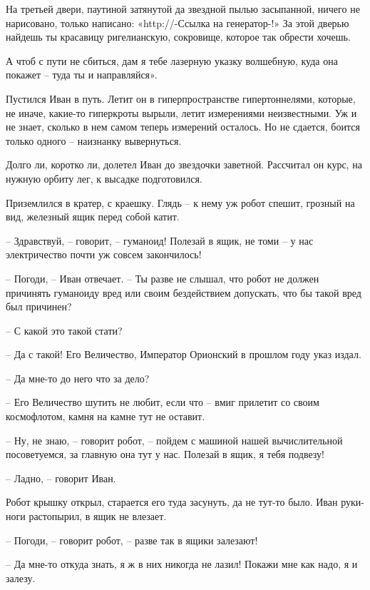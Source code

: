 \documentclass[ebook,oneside,final,openright]{memoir}
\begin{document}
\par
На третьей двери, паутиной затянутой да звездной пылью засыпанной, ничего не нарисовано, только написано: «http://-Ссылка на генератор-!» За этой дверью найдешь ты красавицу ригелианскую, сокровище, которое так обрести хочешь.\par
\par
А чтоб с пути не сбиться, дам я тебе лазерную указку волшебную, куда она покажет – туда ты и направляйся».\par
\par
Пустился Иван в путь. Летит он в гиперпространстве гипертоннелями, которые, не иначе, какие-то гиперкроты вырыли, летит измерениями неизвестными. Уж и не знает, сколько в нем самом теперь измерений осталось. Но не сдается, боится только одного – наизнанку вывернуться.\par
\par
Долго ли, коротко ли, долетел Иван до звездочки заветной. Рассчитал он курс, на нужную орбиту лег, к высадке подготовился.\par
\par
Приземлился в кратер, с краешку. Глядь – к нему уж робот спешит, грозный на вид, железный ящик перед собой катит.\par
– Здравствуй, – говорит, – гуманоид! Полезай в ящик, не томи – у нас электричество почти уж совсем закончилось!\par
– Погоди, – Иван отвечает. – Ты разве не слышал, что робот не должен причинять гуманоиду вред или своим бездействием допускать, что бы такой вред был причинен?\par
– С какой это такой стати?\par
– Да с такой! Его Величество, Император Орионский в прошлом году указ издал.\par
– Да мне-то до него что за дело?\par
– Его Величество шутить не любит, если что – вмиг прилетит со своим космофлотом, камня на камне тут не оставит.\par
– Ну, не знаю, – говорит робот, – пойдем с машиной нашей вычислительной посоветуемся, за главную она тут у нас. Полезай в ящик, я тебя подвезу!\par
– Ладно, – говорит Иван.\par
Робот крышку открыл, старается его туда засунуть, да не тут-то было. Иван руки-ноги растопырил, в ящик не влезает. \par
– Погоди, – говорит робот, – разве так в ящики залезают! \par
– Да мне-то откуда знать, я ж в них никогда не лазил! Покажи мне как надо, я и залезу. \par
\end{document}
